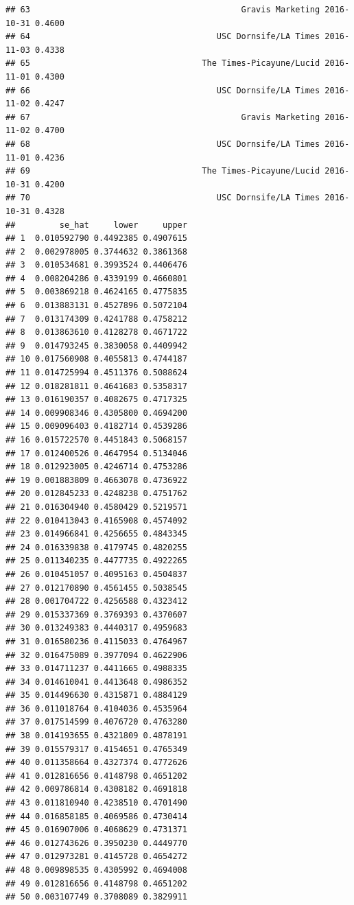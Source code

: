 \documentclass[
]{article}
\begin{document}
\begin{verbatim}
## 63                                           Gravis Marketing 2016-10-31 0.4600
## 64                                      USC Dornsife/LA Times 2016-11-03 0.4338
## 65                                   The Times-Picayune/Lucid 2016-11-01 0.4300
## 66                                      USC Dornsife/LA Times 2016-11-02 0.4247
## 67                                           Gravis Marketing 2016-11-02 0.4700
## 68                                      USC Dornsife/LA Times 2016-11-01 0.4236
## 69                                   The Times-Picayune/Lucid 2016-10-31 0.4200
## 70                                      USC Dornsife/LA Times 2016-10-31 0.4328
##         se_hat     lower     upper
## 1  0.010592790 0.4492385 0.4907615
## 2  0.002978005 0.3744632 0.3861368
## 3  0.010534681 0.3993524 0.4406476
## 4  0.008204286 0.4339199 0.4660801
## 5  0.003869218 0.4624165 0.4775835
## 6  0.013883131 0.4527896 0.5072104
## 7  0.013174309 0.4241788 0.4758212
## 8  0.013863610 0.4128278 0.4671722
## 9  0.014793245 0.3830058 0.4409942
## 10 0.017560908 0.4055813 0.4744187
## 11 0.014725994 0.4511376 0.5088624
## 12 0.018281811 0.4641683 0.5358317
## 13 0.016190357 0.4082675 0.4717325
## 14 0.009908346 0.4305800 0.4694200
## 15 0.009096403 0.4182714 0.4539286
## 16 0.015722570 0.4451843 0.5068157
## 17 0.012400526 0.4647954 0.5134046
## 18 0.012923005 0.4246714 0.4753286
## 19 0.001883809 0.4663078 0.4736922
## 20 0.012845233 0.4248238 0.4751762
## 21 0.016304940 0.4580429 0.5219571
## 22 0.010413043 0.4165908 0.4574092
## 23 0.014966841 0.4256655 0.4843345
## 24 0.016339838 0.4179745 0.4820255
## 25 0.011340235 0.4477735 0.4922265
## 26 0.010451057 0.4095163 0.4504837
## 27 0.012170890 0.4561455 0.5038545
## 28 0.001704722 0.4256588 0.4323412
## 29 0.015337369 0.3769393 0.4370607
## 30 0.013249383 0.4440317 0.4959683
## 31 0.016580236 0.4115033 0.4764967
## 32 0.016475089 0.3977094 0.4622906
## 33 0.014711237 0.4411665 0.4988335
## 34 0.014610041 0.4413648 0.4986352
## 35 0.014496630 0.4315871 0.4884129
## 36 0.011018764 0.4104036 0.4535964
## 37 0.017514599 0.4076720 0.4763280
## 38 0.014193655 0.4321809 0.4878191
## 39 0.015579317 0.4154651 0.4765349
## 40 0.011358664 0.4327374 0.4772626
## 41 0.012816656 0.4148798 0.4651202
## 42 0.009786814 0.4308182 0.4691818
## 43 0.011810940 0.4238510 0.4701490
## 44 0.016858185 0.4069586 0.4730414
## 45 0.016907006 0.4068629 0.4731371
## 46 0.012743626 0.3950230 0.4449770
## 47 0.012973281 0.4145728 0.4654272
## 48 0.009898535 0.4305992 0.4694008
## 49 0.012816656 0.4148798 0.4651202
## 50 0.003107749 0.3708089 0.3829911

\end{verbatim}
\end{document}
